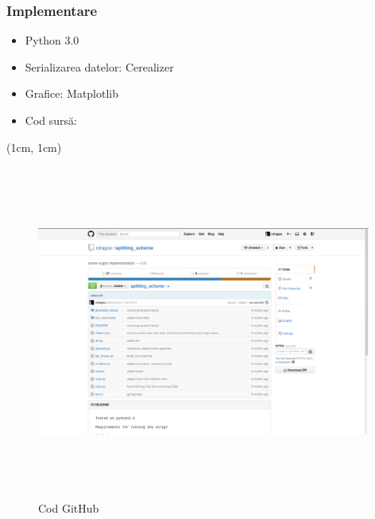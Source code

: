 \documentclass{beamer}
\theoremstyle{definition}
\begin{document}
\begin{frame}
    \frametitle{Implementare}
     {
        \begin{itemize}
            \item Python 3.0
            \item Serializarea datelor: Cerealizer
            \item Grafice: Matplotlib
            \pause
            \item Cod surs\u{a}: \href{https://github.com/rdragos/splitting_scheme}{}
        \end{itemize}
    }
     {
       \begin{center}
         \begin{textblock*}{4cm}(1cm, 1cm)
            \begin{figure}
                \includegraphics[width=11cm,height=11cm,keepaspectratio]{img/results/github.png}
                \caption{Cod GitHub}
           \end{figure}
        \end{textblock*} 
        \end{center} 
    }
\end{frame}
\end{document}
